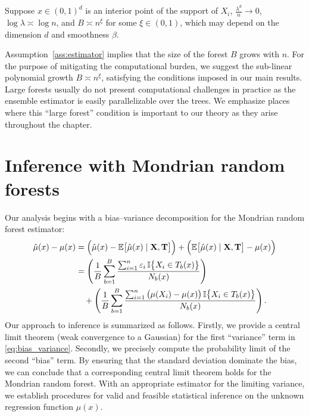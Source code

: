 \begin{assumption}%
  \label{ass:estimator}
  Suppose $x \in (0,1)^d$ is an interior point of the support of $X_i$,
  $\frac{\lambda^d}{n} \to 0$,
  $\log \lambda \asymp \log n$,
  and $B \asymp n^{\xi}$ for some $\xi \in (0, 1)$,
  which may depend on the dimension $d$ and smoothness $\beta$.
\end{assumption}

Assumption~\ref{ass:estimator} implies that the size of the forest $B$ grows
with $n$. For the purpose of mitigating the computational burden, we suggest
the sub-linear polynomial growth $B \asymp n^{\xi}$, satisfying the conditions
imposed in our main results. Large forests usually do not present computational
challenges in practice as the ensemble estimator is easily parallelizable over
the trees. We emphasize places where this ``large forest'' condition is
important to our theory as they arise throughout the chapter.

\section{Inference with Mondrian random forests}%
\label{sec:mondrian_inference}

Our analysis begins with a bias--variance decomposition for the Mondrian random
forest estimator:
%
\begin{align}
  \nonumber
  \hat\mu(x) - \mu(x)
  &=
  \Big( \hat\mu(x) - \mathbb{E} \big[ \hat \mu(x) \mid \mathbf{X}, \mathbf{T} \big]\Big)
  + \Big( \mathbb{E} \big[ \hat \mu(x) \mid \mathbf{X}, \mathbf{T} \big] - \mu(x)\Big) \\
  &=
  \nonumber
  \left(
    \frac{1}{B} \sum_{b=1}^B
    \frac{\sum_{i=1}^n \varepsilon_i \, \mathbb{I}\big\{ X_i \in T_b(x) \big\}} {N_b(x)}
  \right) \\
  \label{eq:bias_variance}
  &\quad+
  \left(
    \frac{1}{B} \sum_{b=1}^B
    \frac{\sum_{i=1}^n \big(\mu(X_i) - \mu(x)\big) \,
    \mathbb{I}\big\{ X_i \in T_b(x) \big\}} {N_b(x)}
  \right).
\end{align}
%
Our approach to inference is summarized as follows. Firstly, we provide a
central limit theorem (weak convergence to a Gaussian) for the first
``variance'' term in \eqref{eq:bias_variance}. Secondly, we precisely compute
the probability limit of the second ``bias'' term. By ensuring that the
standard deviation dominate the bias, we can conclude that a corresponding
central limit theorem holds for the Mondrian random forest. With an appropriate
estimator for the limiting variance, we establish procedures for valid and
feasible statistical inference on the unknown regression function $\mu(x)$.


